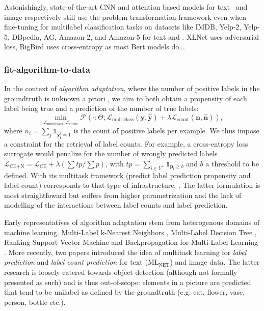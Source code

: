 Astonishingly, state-of-the-art CNN and attention based models for text~\cite{XLNet, bigBird, } and image respectively still use the problem transformation framework even when fine-tuning for multilabel classification tasks on datasets like IMDB, Yelp-2, Yelp-5, DBpedia, AG, Amazon-2, and Amazon-5 for text and .  XLNet uses adversarial loss, BigBird uses cross-entropy as most Bert models do...


\subsubsection{fit-algorithm-to-data}
In the context of \emph{algorithm
adaptation}, where the number of positive labels in the groundtruth is unknown
a priori , we aim to
both obtain a propensity of each label being true and a prediction of the
number of true labels:
%
\begin{equation}
\underset{\mathcal{L}_{\text {multiclass}}, \mathcal{L}_{\text {count}}}
{\min} \mathcal{F}\left(\cdot ; \Theta; \mathcal{L}_{\text {multiclass}}
(\mathbf{y}, \hat{\mathbf{y}}) + \lambda \mathcal{L}_{\text {count}}
(\mathbf{n}, \hat{\mathbf{n}})\right),
\end{equation}
%
where \(n_i = \sum_j \mathds{1}_{\mathbf{y_i^j} = 1}\) is the count of
positive labels per example. We thus impose a constraint for the retrieval of
label counts. For example, a cross-entropy loss surrogate would penalize for the number of wrongly predicted
labels \(\mathcal{L}_{\text {CE+N}}= \mathcal{L}_{\text {CE}} + \lambda (\sum
tp / \sum p)\), with \(t p=\sum_{i \in Y^{+}} \mathds{1}_{\mathbf{p_i} \geq
b}\) and \(b\) a threshold to be defined. With its multitask framework
(predict label prediction propensity and label count) \cite{multitaskLabel}
corresponds to that type of infrastructure. . The latter
formulation is most straightfoward but suffers from higher parametrization and
the lack of modelling of the interactions between label counts and label
prediction.

Early representatives of algorithm adaptation stem from heterogenous
domains of machine learning. Multi-Label k-Nearest Neighbors \cite{ML-KNN},
Multi-Label Decision Tree \cite{ML-DT}, Ranking Support Vector Machine
\cite{multilabelSVM} and Backpropagation for Multi-Label Learning
\cite{multilabelBackprop}. More recently, two papers introduced the idea of
multitask learning for \emph{label prediction} and \emph{label count
prediction} for text (ML\(_{\text{NET}}\)) \cite{multitaskLabel} and image
\cite{multitaskLabelImages} data. The latter research is loosely catered
towards object detection (although not formally presented as such) and is thus
out-of-scope: elements in a picture are predicted that tend to be unilabel as
defined by the groundtruth (e.g. cat, flower, vase, person, bottle etc.).

